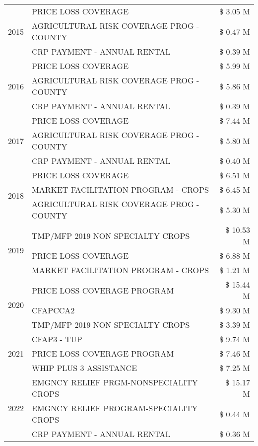 \begin{tabular}{llr}
\multirow[t]{3}{*}{2015} & PRICE LOSS COVERAGE & \$ 3.05 M \\
 & AGRICULTURAL RISK COVERAGE PROG - COUNTY & \$ 0.47 M \\
 & CRP PAYMENT - ANNUAL RENTAL & \$ 0.39 M \\
\cline{1-3}
\multirow[t]{3}{*}{2016} & PRICE LOSS COVERAGE & \$ 5.99 M \\
 & AGRICULTURAL RISK COVERAGE PROG - COUNTY & \$ 5.86 M \\
 & CRP PAYMENT - ANNUAL RENTAL & \$ 0.39 M \\
\cline{1-3}
\multirow[t]{3}{*}{2017} & PRICE LOSS COVERAGE & \$ 7.44 M \\
 & AGRICULTURAL RISK COVERAGE PROG - COUNTY & \$ 5.80 M \\
 & CRP PAYMENT - ANNUAL RENTAL & \$ 0.40 M \\
\cline{1-3}
\multirow[t]{3}{*}{2018} & PRICE LOSS COVERAGE & \$ 6.51 M \\
 & MARKET FACILITATION PROGRAM - CROPS & \$ 6.45 M \\
 & AGRICULTURAL RISK COVERAGE PROG - COUNTY & \$ 5.30 M \\
\cline{1-3}
\multirow[t]{3}{*}{2019} & TMP/MFP 2019 NON SPECIALTY CROPS & \$ 10.53 M \\
 & PRICE LOSS COVERAGE & \$ 6.88 M \\
 & MARKET FACILITATION PROGRAM - CROPS & \$ 1.21 M \\
\cline{1-3}
\multirow[t]{3}{*}{2020} & PRICE LOSS COVERAGE PROGRAM & \$ 15.44 M \\
 & CFAPCCA2 & \$ 9.30 M \\
 & TMP/MFP 2019 NON SPECIALTY CROPS & \$ 3.39 M \\
\cline{1-3}
\multirow[t]{3}{*}{2021} & CFAP3 - TUP & \$ 9.74 M \\
 & PRICE LOSS COVERAGE PROGRAM & \$ 7.46 M \\
 & WHIP PLUS 3 ASSISTANCE & \$ 7.25 M \\
\cline{1-3}
\multirow[t]{3}{*}{2022} & EMGNCY RELIEF PRGM-NONSPECIALITY CROPS & \$ 15.17 M \\
 & EMGNCY RELIEF PROGRAM-SPECIALITY CROPS & \$ 0.44 M \\
 & CRP PAYMENT - ANNUAL RENTAL & \$ 0.36 M \\
\cline{1-3}
\bottomrule
\end{tabular}
